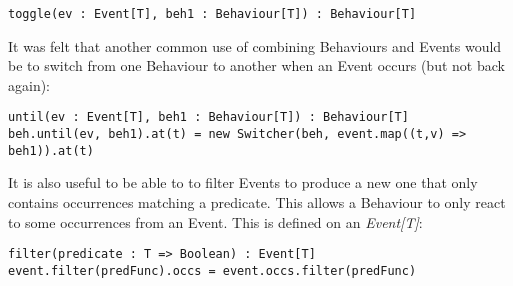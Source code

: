 \begin{verbatim}
toggle(ev : Event[T], beh1 : Behaviour[T]) : Behaviour[T]
\end{verbatim}        
      
      It was felt that another common use of combining Behaviours and Events would be
      to switch from one Behaviour to another when an Event occurs (but not back again):

\begin{verbatim}
until(ev : Event[T], beh1 : Behaviour[T]) : Behaviour[T]
beh.until(ev, beh1).at(t) = new Switcher(beh, event.map((t,v) => beh1)).at(t)
\end{verbatim}        
      
      It is also useful to be able to to filter Events to produce a new one that only
      contains occurrences matching a predicate. This allows a Behaviour to only react
      to some occurrences from an Event. This is defined on an \emph{Event[T]}:

\begin{verbatim}
filter(predicate : T => Boolean) : Event[T]
event.filter(predFunc).occs = event.occs.filter(predFunc)
\end{verbatim}        